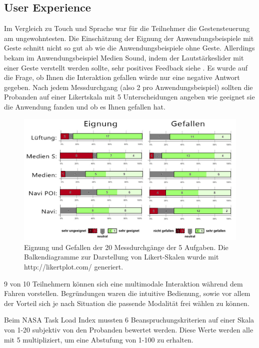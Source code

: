 \subsection[User Experience]{User Experience}
Im Vergleich zu Touch und Sprache war für die Teilnehmer die Gestensteuerung am ungewohntesten. Die Einschätzung der Eignung der Anwendungsbeispiele mit Geste schnitt nicht so gut ab wie die Anwendungsbeispiele ohne Geste. Allerdings bekam im Anwendungsbeispiel Medien Sound, indem der Lautstärkeslider mit einer Geste verstellt werden sollte, sehr positives Feedback siehe . Es wurde auf die Frage, ob Ihnen die Interaktion gefallen würde nur eine negative Antwort gegeben. Nach jedem Messdurchgang (also 2 pro Anwendungsbeispiel) sollten die Probanden auf einer Likertskala mit 5 Unterscheidungen angeben wie geeignet sie die Anwendung fanden und ob es Ihnen gefallen hat.
\begin{figure}
	\centering
		\includegraphics[width=1\textwidth]{img/Smiley_Eignung_Gefallen.jpg}
	\caption[Eignung und Gefallen der 5 Aufgaben]{Eignung und Gefallen der 20 Messdurchgänge der 5 Aufgaben. Die Balkendiagramme zur Darstellung von Likert-Skalen wurde mit http://likertplot.com/ generiert.}
	\label{fig:Smiley_Eignung_Gefallen}
\end{figure}
 
9 von 10 Teilnehmern können sich eine multimodale Interaktion während dem Fahren vorstellen. Begründungen waren die intuitive Bedienung, sowie vor allem der Vorteil sich je nach Situation die passende Modalität frei wählen zu können.

Beim NASA Task Load Index mussten 6 Beanspruchungskriterien auf einer Skala von 1-20 subjektiv von den Probanden bewertet werden. Diese Werte werden alle mit 5 multipliziert, um eine Abstufung von 1-100 zu erhalten. 


